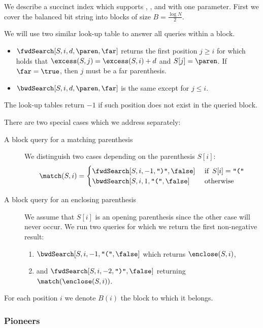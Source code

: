 
We describe a succinct index which supports \findClose{}, \findOpen{}, and \enclose{} with one parameter.
First we cover the balanced bit string into blocks of size $B = \frac{\log N}{2}$.

We will use two similar look-up table to answer all queries within a block.
\begin{itemize}
	\item $\fwdSearch[S, i, d, \paren, \far]$ returns the first position $j \ge i$ for which holds that $\excess(S, j) = \excess(S, i) + d$ and $S[j] = \paren$.
	If $\far = \true$, then $j$ must be a far parenthesis.
	\item $\bwdSearch[S, i, d, \paren, \far]$ is the same except for $j \le i$.
\end{itemize}
The look-up tables return $-1$ if such position does not exist in the queried block.

There are two special cases which we address separately:
\begin{description}
	\item[A block query for a matching parenthesis]
	We distinguish two cases depending on the parenthesis $S[i]$:
	$$\match(S, i) = \begin{cases}
		\fwdSearch[S, i, -1, \closingParen, \false] & \textif S[i] = \openingParen \\
		\bwdSearch[S, i, 1, \openingParen, \false] & \textotherwise
	\end{cases}$$
	
	\item[A block query for an enclosing parenthesis]
	We assume that $S[i]$ is an opening parenthesis since the other case will never occur.
	We run two queries for which we return the first non-negative result:
	\begin{enumerate}
		\item $\bwdSearch[S, i, -1, \openingParen, \false]$ which returns $\enclose(S, i)$,
		\item and $\fwdSearch[S, i, -2, \closingParen, \false]$ returning $\match(\enclose(S, i))$.
	\end{enumerate}
\end{description}

For each position $i$ we denote $B(i)$ the block to which it belongs.

\subsubsection{Pioneers}

